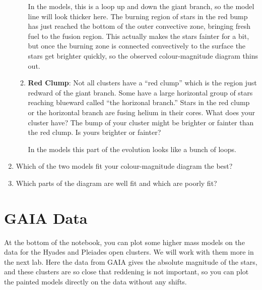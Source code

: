 \documentclass{article}
\begin{document}
\begin{enumerate}
\begin{enumerate}
    In the models, this is a loop up and down the giant branch, so the model line will look thicker here.  The burning region of stars in the red bump has just reached the bottom of the outer convective zone, bringing fresh fuel to the fusion region. This actually makes the stars fainter for a bit, but once the burning zone is connected convectively to the surface the stars get brighter quickly, so the observed colour-magnitude diagram thins out.
    
    \item \textbf{Red Clump}: Not all clusters have a ``red clump'' which is the region just redward of the giant branch.  Some have a large horizontal group of stars reaching blueward called ``the horizonal branch.''  Stars in the red clump or the horizontal branch are fusing helium in their cores.  What does your cluster have?  The bump of your cluster might be brighter or fainter than the red clump.  Is yours brighter or fainter?  
    
    In the models this part of the evolution looks like a bunch of loops.
\end{enumerate}
    \item Which of the two models fit your colour-magnitude diagram the best?  
    \item Which parts of the diagram are well fit and which are poorly fit?
\end{enumerate}

\section{GAIA Data}

At the bottom of the notebook, you can plot some higher mass models on the data for the Hyades and Pleiades open clusters.  We will work with them more in the next lab.   Here the data from GAIA gives the absolute magnitude of the stars, and these clusters are so close that reddening is not important, so you can plot the painted models directly on the data without any shifts.
\end{document}
